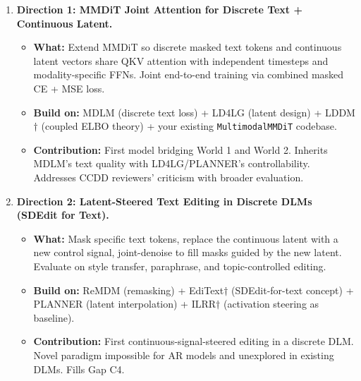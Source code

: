 \documentclass{article}
\begin{document}
\begin{enumerate}
    \item \textbf{Direction 1: MMDiT Joint Attention for Discrete Text + Continuous Latent.}
    \begin{itemize}[nosep]
        \item \textbf{What:} Extend MMDiT so discrete masked text tokens and continuous latent vectors share QKV attention with independent timesteps and modality-specific FFNs. Joint end-to-end training via combined masked CE + MSE loss.
        \item \textbf{Build on:} MDLM (discrete text loss) + LD4LG (latent design) + LDDM$\dagger$ (coupled ELBO theory) + your existing \texttt{MultimodalMMDiT} codebase.
        \item \textbf{Contribution:} First model bridging World 1 and World 2. Inherits MDLM's text quality with LD4LG/PLANNER's controllability. Addresses CCDD reviewers' criticism with broader evaluation.
    \end{itemize}

    \item \textbf{Direction 2: Latent-Steered Text Editing in Discrete DLMs (SDEdit for Text).}
    \begin{itemize}[nosep]
        \item \textbf{What:} Mask specific text tokens, replace the continuous latent with a new control signal, joint-denoise to fill masks guided by the new latent. Evaluate on style transfer, paraphrase, and topic-controlled editing.
        \item \textbf{Build on:} ReMDM (remasking) + EdiText$\dagger$ (SDEdit-for-text concept) + PLANNER (latent interpolation) + ILRR$\dagger$ (activation steering as baseline).
        \item \textbf{Contribution:} First continuous-signal-steered editing in a discrete DLM. Novel paradigm impossible for AR models and unexplored in existing DLMs. Fills Gap C4.
    \end{itemize}


\end{enumerate}
\end{document}
